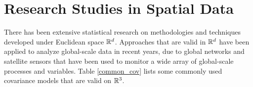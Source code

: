 


\section{Research Studies in Spatial Data}

There has been extensive statistical research on methodologies and techniques developed under Euclidean space $\mathbb{R}^d$. Approaches that are valid in $\mathbb{R}^d$ have been applied to analyze global-scale data in recent years, due to global networks and satellite sensors that have been used to monitor a wide array of global-scale processes and variables. Table \ref{common_cov} lists some commonly used covariance models that are valid on $\mathbb{R}^3$.

